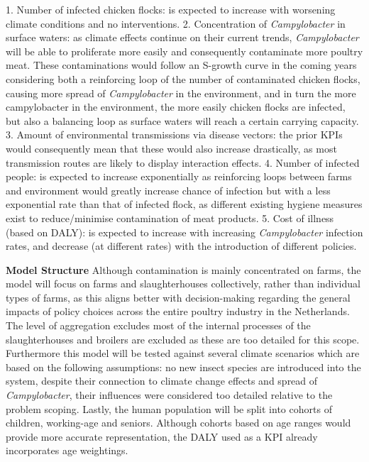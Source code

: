 1. Number of infected chicken flocks: is expected to increase with worsening climate conditions and no interventions.
2. Concentration of \textit{Campylobacter} in surface waters: as climate effects continue on their current trends, \textit{Campylobacter} will be able to proliferate more easily and consequently contaminate more poultry meat. These contaminations would follow an S-growth curve in the coming years considering both a reinforcing loop of the number of contaminated chicken flocks, causing more spread of \textit{Campylobacter} in the environment, and in turn the more campylobacter in the environment, the more easily chicken flocks are infected, but also a balancing loop as surface waters will reach a certain carrying capacity. %
3. Amount of environmental transmissions via disease vectors: the prior KPIs would consequently mean that these would also increase drastically, as most transmission routes are likely to display interaction effects.
4. Number of infected people: is expected to increase exponentially as reinforcing loops between farms and environment would greatly increase chance of infection but with a less exponential rate than that of infected flock, as different existing hygiene measures exist to reduce/minimise contamination of meat products.
5. Cost of illness (based on DALY): is expected to increase with increasing \textit{Campylobacter} infection rates, and decrease (at different rates) with the introduction of different policies.
 
\textbf{Model Structure}
Although contamination is mainly concentrated on farms, the model will focus on farms and slaughterhouses collectively, rather than individual types of farms, as this aligns better with decision-making regarding the general impacts of policy choices across the entire poultry industry in the Netherlands. The level of aggregation excludes most of the internal processes of the slaughterhouses and broilers are excluded as these are too detailed for this scope. Furthermore this model will be tested against several climate scenarios which are based on the following assumptions: no new insect species are introduced into the system, despite their connection to climate change effects and spread of \textit{Campylobacter}, their influences were considered too detailed relative to the problem scoping. 
Lastly, the human population will be split into cohorts of children, working-age and seniors. Although cohorts based on age ranges would provide more accurate representation, the DALY used as a KPI already incorporates age weightings. %


